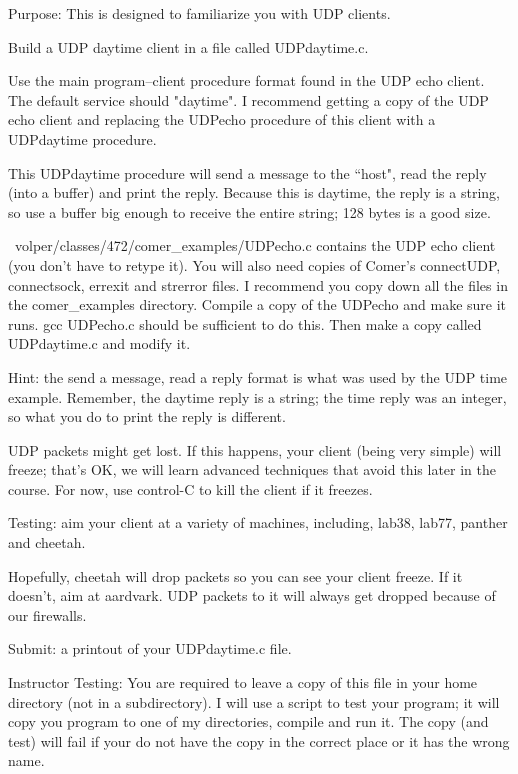 

\parindent 0pt

Purpose: This is designed to familiarize you with UDP clients.

Build a UDP daytime client in a file called {\ltt{}UDPdaytime.c}.

Use the main program--client procedure format found
in the UDP echo client.
The default service should {\ltt{}"daytime"}.
I recommend  getting a copy of the UDP echo client and
replacing the {\ltt{}UDPecho} procedure of this client
with a {\ltt{}UDPdaytime} procedure.

This {\ltt{}UDPdaytime} procedure will send a message
to the ``host", read the reply (into a buffer)
and print the reply.
Because this is daytime, the reply is a string, so use
a buffer big enough to receive the entire string;
128 bytes is a good size.

{\ltt{}~volper/classes/472/comer_examples/UDPecho.c}
contains the UDP echo client (you don't have to retype it).
You will also need copies of Comer's {\ltt{}connectUDP},
{\ltt{}connectsock}, {\ltt{}errexit} and {\ltt{}strerror}
files.
I recommend you copy down all the files in the {\ltt{}comer_examples}
directory.
Compile a copy of the {\ltt{}UDPecho} and make sure it runs.
{\ltt{}gcc UDPecho.c} should be sufficient to do this.
Then make a copy called {\ltt{}UDPdaytime.c} and modify it.

Hint: the send a message, read a reply format is what
was used by the UDP time example.
Remember, the daytime reply is a string;
the time reply was an integer, so what you do to print
the reply is different.

UDP packets might get lost.
If this happens, your client (being very simple) will freeze;
that's OK, we will learn advanced techniques that avoid this
later in the course.
For now, use control-C to kill the client if it freezes.

Testing: aim your client at a variety of machines, including,
{\ltt{}lab38}, {\ltt{}lab77}, {\ltt{}panther} and {\ltt{}cheetah}.

Hopefully, {\ltt{}cheetah} will drop packets so you can see your
client freeze. 
If it doesn't, aim at {\ltt{}aardvark}.
UDP packets to it  will always get
dropped because of our firewalls.

Submit: a printout of your {\ltt{}UDPdaytime.c} file.

Instructor Testing:
You are required to leave a copy of this file in your home directory
(not in a subdirectory).
I will use a script to test your program; it will copy you program
to one of my directories, compile and run it.
The copy (and test) will fail if your do not have the copy in
the correct place or it has the wrong name.
\bye
